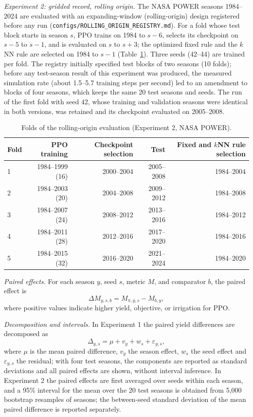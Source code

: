 \documentclass[times,final,authoryear]{elsarticle}
\begin{document}
\emph{Experiment 2: gridded record, rolling origin.} The NASA POWER seasons 1984--2024 are evaluated with an expanding-window (rolling-origin) design registered before any run (\texttt{configs/ROLLING\_ORIGIN\_REGISTRY.md}). For a fold whose test block starts in season $s$, PPO trains on 1984 to $s-6$, selects its checkpoint on $s-5$ to $s-1$, and is evaluated on $s$ to $s+3$; the optimized fixed rule and the $k$NN rule are selected on 1984 to $s-1$ (Table~\ref{tab_folds}). Three seeds (42--44) are trained per fold. The registry initially specified test blocks of two seasons (10 folds); before any test-season result of this experiment was produced, the measured simulation rate (about 1.5--5.7 training steps per second) led to an amendment to blocks of four seasons, which keeps the same 20 test seasons and seeds. The run of the first fold with seed 42, whose training and validation seasons were identical in both versions, was retained and its checkpoint evaluated on 2005--2008.

\begin{table}[!h]
\centering
\scriptsize
\caption{Folds of the rolling-origin evaluation (Experiment 2, NASA POWER).}
\label{tab_folds}
\begin{tabular}{lrrrr}
\hline
Fold & PPO training & Checkpoint selection & Test & Fixed and $k$NN rule selection \\
\hline
1 & 1984--1999 (16) & 2000--2004 & 2005--2008 & 1984--2004 \\
2 & 1984--2003 (20) & 2004--2008 & 2009--2012 & 1984--2008 \\
3 & 1984--2007 (24) & 2008--2012 & 2013--2016 & 1984--2012 \\
4 & 1984--2011 (28) & 2012--2016 & 2017--2020 & 1984--2016 \\
5 & 1984--2015 (32) & 2016--2020 & 2021--2024 & 1984--2020 \\
\hline
\end{tabular}
\end{table}

\emph{Paired effects.} For each season $y$, seed $s$, metric $M$, and comparator $b$, the paired effect is
\begin{equation}
\Delta M_{y,s,b} = M_{\pi,y,s} - M_{b,y},
\label{eq_paired}
\end{equation}
where positive values indicate higher yield, objective, or irrigation for PPO.

\emph{Decomposition and intervals.} In Experiment 1 the paired yield differences are decomposed as
\begin{equation}
\Delta_{y,s} = \mu + v_y + w_s + \varepsilon_{y,s},
\label{eq_mixed}
\end{equation}
where $\mu$ is the mean paired difference, $v_y$ the season effect, $w_s$ the seed effect and $\varepsilon_{y,s}$ the residual; with four test seasons, the components are reported as standard deviations and all paired effects are shown, without interval inference. In Experiment 2 the paired effects are first averaged over seeds within each season, and a 95\% interval for the mean over the 20 test seasons is obtained from 5,000 bootstrap resamples of seasons; the between-seed standard deviation of the mean paired difference is reported separately.
\end{document}

